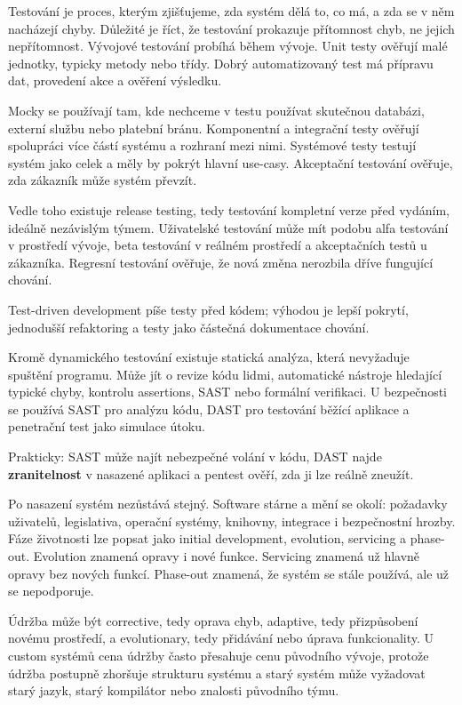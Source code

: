 Testování je proces, kterým zjišťujeme, zda systém dělá to, co má, a zda se v něm nacházejí chyby. Důležité je říct, že testování prokazuje přítomnost chyb, ne jejich nepřítomnost. Vývojové testování probíhá během vývoje. Unit testy ověřují malé jednotky, typicky metody nebo třídy. Dobrý automatizovaný test má přípravu dat, provedení akce a ověření výsledku.

Mocky se používají tam, kde nechceme v testu používat skutečnou databázi, externí službu nebo platební bránu. Komponentní a integrační testy ověřují spolupráci více částí systému a rozhraní mezi nimi. Systémové testy testují systém jako celek a měly by pokrýt hlavní use-casy. Akceptační testování ověřuje, zda zákazník může systém převzít.

Vedle toho existuje release testing, tedy testování kompletní verze před vydáním, ideálně nezávislým týmem. Uživatelské testování může mít podobu alfa testování v prostředí vývoje, beta testování v reálném prostředí a akceptačních testů u zákazníka. Regresní testování ověřuje, že nová změna nerozbila dříve fungující chování.

Test-driven development píše testy před kódem; výhodou je lepší pokrytí, jednodušší refaktoring a testy jako částečná dokumentace chování.

Kromě dynamického testování existuje statická analýza, která nevyžaduje spuštění programu. Může jít o revize kódu lidmi, automatické nástroje hledající typické chyby, kontrolu assertions, SAST nebo formální verifikaci. U bezpečnosti se používá SAST pro analýzu kódu, DAST pro testování běžící aplikace a penetrační test jako simulace útoku.

Prakticky: SAST může najít nebezpečné volání v kódu, DAST najde \textbf{zranitelnost} v nasazené aplikaci a pentest ověří, zda ji lze reálně zneužít.

Po nasazení systém nezůstává stejný. Software stárne a mění se okolí: požadavky uživatelů, legislativa, operační systémy, knihovny, integrace i bezpečnostní hrozby. Fáze životnosti lze popsat jako initial development, evolution, servicing a phase-out. Evolution znamená opravy i nové funkce. Servicing znamená už hlavně opravy bez nových funkcí. Phase-out znamená, že systém se stále používá, ale už se nepodporuje.

Údržba může být corrective, tedy oprava chyb, adaptive, tedy přizpůsobení novému prostředí, a evolutionary, tedy přidávání nebo úprava funkcionality. U custom systémů cena údržby často přesahuje cenu původního vývoje, protože údržba postupně zhoršuje strukturu systému a starý systém může vyžadovat starý jazyk, starý kompilátor nebo znalosti původního týmu.

